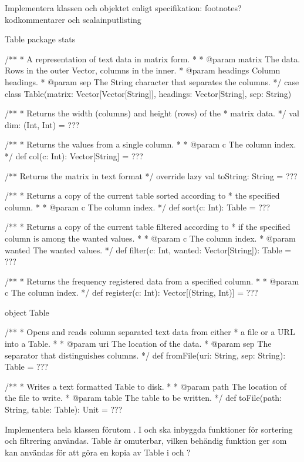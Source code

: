 \Task Implementera klassen  och objektet  enligt specifikation:
\TODO footnotes?
\TODO kodkommentarer och scalainputlisting

\begin{ScalaSpec}{Table}
package stats

/**
 * A representation of text data in matrix form.
 *
 * @param matrix   The data. Rows in the outer Vector, columns in the inner.
 * @param headings Column headings.
 * @param sep      The String character that separates the columns.
 */
case class Table(matrix: Vector[Vector[String]], headings: Vector[String], sep: String) {

  /**
   * Returns the width (columns) and height (rows) of the
   * matrix data.
   */
  val dim: (Int, Int) = ???

  /**
   * Returns the values from a single column.
   *
   *  @param c The column index.
   */
  def col(c: Int): Vector[String] = ???

  /** Returns the matrix in text format */
  override lazy val toString: String = ???

  /**
   * Returns a copy of the current table sorted according to
   * the specified column.
   *
   * @param c The column index.
   */
  def sort(c: Int): Table = ???

  /**
   * Returns a copy of the current table filtered according to
   * if the specified column is among the wanted values.
   *
   * @param c      The column index.
   * @param wanted The wanted values.
   */
  def filter(c: Int, wanted: Vector[String]): Table = ???

  /**
   * Returns the frequency registered data from a specified column.
   *
   * @param c The column index.
   */
  def register(c: Int): Vector[(String, Int)] = ???
}

object Table {

  /**
   * Opens and reads column separated text data from either
   * a file or a URL into a Table.
   *
   * @param uri The location of the data.
   * @param sep The separator that distinguishes columns.
   */
  def fromFile(uri: String, sep: String): Table = ???

  /**
   * Writes a text formatted Table to disk.
   *
   * @param path  The location of the file to write.
   * @param table The table to be written.
   */
  def toFile(path: String, table: Table): Unit = ???
}
\end{ScalaSpec}

\Subtask Implementera hela klassen  förutom . I  och  ska inbyggda funktioner för sortering och filtrering användas. Table är omuterbar, vilken behändig funktion ger  som kan användas för att göra en kopia av Table i  och ?

